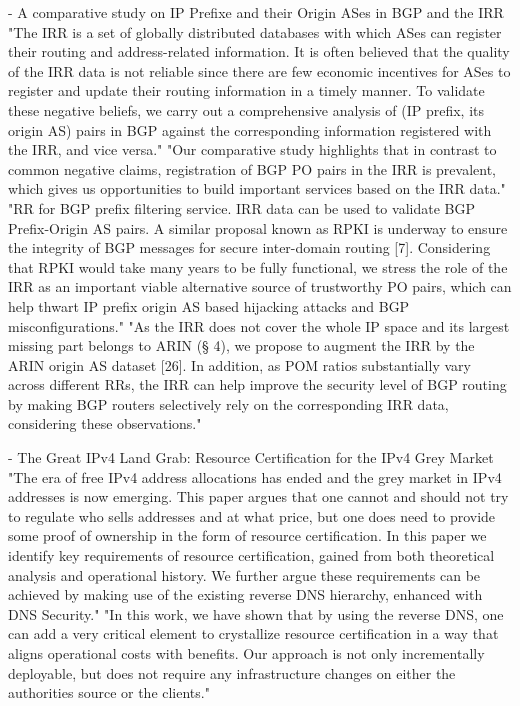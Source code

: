 \documentclass[11pt,a4paper]{scrreprt}
\begin{document}
- A comparative study on IP Prefixe and their Origin ASes in BGP and the IRR
 "The IRR is a set of globally distributed databases with which ASes can register their routing and address-related information. It is often believed that the quality of the IRR data is not reliable since there are few economic incentives for ASes to register and update their routing information in a timely manner. To validate these negative beliefs, we carry out a comprehensive analysis of (IP prefix, its origin AS) pairs in BGP against the corresponding information registered with the IRR, and vice versa."
 "Our comparative study highlights that in contrast to common negative claims, registration of BGP PO pairs in the IRR is prevalent, which gives us opportunities to build important services based on the IRR data."
"RR for BGP prefix filtering service. IRR data can be used to validate BGP Prefix-Origin AS pairs. A similar proposal known as RPKI is underway to ensure the integrity of BGP messages for secure inter-domain routing [7]. Considering that RPKI would take many years to be fully functional, we stress the role of the IRR as an important viable alternative source of trustworthy PO pairs, which can help thwart IP prefix origin AS based hijacking attacks and BGP misconfigurations."
"As the IRR does not cover the whole IP space and its largest missing part belongs to ARIN (§ 4), we propose to augment the IRR by the ARIN origin AS dataset [26]. In addition, as POM ratios substantially vary across different RRs, the IRR can help improve the security level of BGP routing by making BGP routers selectively rely on the corresponding IRR data, considering these observations."


- The Great IPv4 Land Grab: Resource Certification for the IPv4 Grey Market
"The era of free IPv4 address allocations has ended and the grey market in IPv4 addresses is now emerging. This paper argues that one cannot and should not try to regulate who sells addresses and at what price, but one does need to provide some proof of ownership in the form of resource certification. In this paper we identify key requirements of resource certification, gained from both theoretical analysis and operational history. We further argue these requirements can be achieved by making use of the existing reverse DNS
hierarchy, enhanced with DNS Security." 
"In this work, we have shown that by using the reverse DNS, one can add a very critical element to crystallize resource certification in a way that aligns operational costs with benefits. Our approach is not only incrementally deployable, but does not require any infrastructure changes on either the authorities source or the clients."
\end{document}
